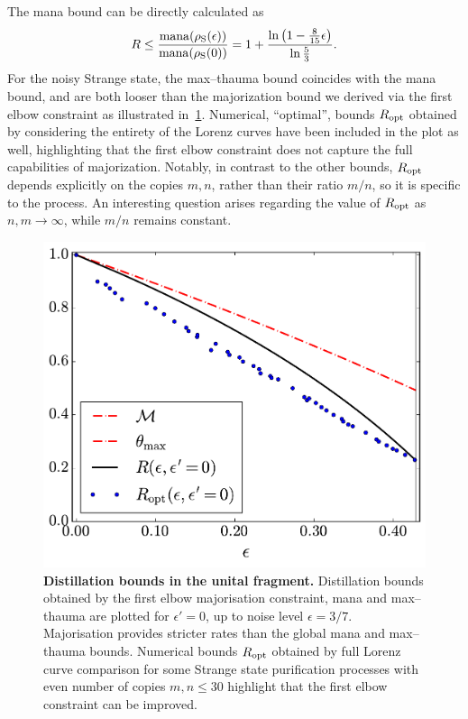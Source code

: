 \documentclass[pra,
aps,
twocolumn,
superscriptaddress,
groupedaddress,
nofootinbib,
reprint
]{revtex4-1}
\begin{document}
The mana bound can be directly calculated as
\begin{equation}
	R \leq \frac{{{\rm{mana}}(\rho_{\rm{S}}(\epsilon))}}{{{\rm{mana}}(\rho_{\rm{S}}(0))}} = 1 + \frac{\ln \left(1 - \frac{8}{15}\epsilon \right)}{\ln \frac{5}{3}}.
\end{equation}
For the noisy Strange state, the max--thauma bound coincides with the mana bound, and are both looser than the majorization bound we derived via the first elbow constraint as illustrated in~\cref{fig:distill_bounds}. 
Numerical, ``optimal'', bounds $R_{\rm{opt}}$ obtained by considering the entirety of the Lorenz curves have been included in the plot as well, highlighting that the first elbow constraint does not capture the full capabilities of majorization.
Notably, in contrast to the other bounds, $R_{\rm{opt}}$ depends explicitly on the copies $m,n$, rather than their ratio $m/n$, so it is specific to the process.
An interesting question arises regarding the value of $R_{\rm{opt}}$ as $n,m \rightarrow \infty$, while $m/n$ remains constant.
\begin{figure}[t]
    \centering
    \includegraphics[scale=0.45]{figs/distill_bounds.pdf}
    \caption{\textbf{Distillation bounds in the unital fragment.} Distillation bounds obtained by the first elbow majorisation constraint, mana and max--thauma are plotted for $\epsilon' = 0$, up to noise level $\epsilon = 3/7$.
    Majorisation provides stricter rates than the global mana and max--thauma bounds.
    Numerical bounds $R_{\rm{opt}}$ obtained by full Lorenz curve comparison for some Strange state purification processes with even number of copies $m,n \leq 30$ highlight that the first elbow constraint can be improved.
    }
    \label{fig:distill_bounds}
\end{figure}
\end{document}
